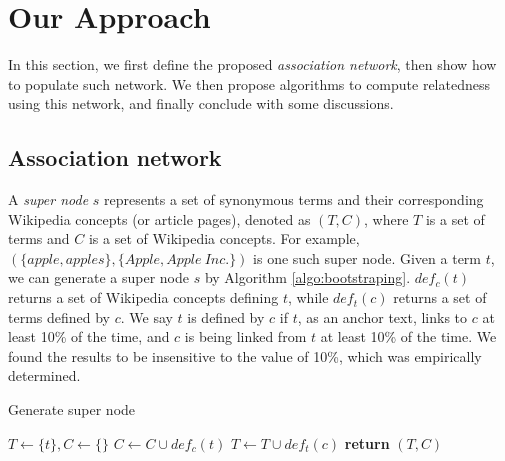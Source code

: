 \section{Our Approach}
\label{sec:approach}

In this section, we first define the proposed {\em association
network}, then show how to populate such network. We then
propose algorithms to compute relatedness using this network,
and finally conclude with some discussions. 

\subsection{Association network}
\label{sec:definition}

A {\em super node} $s$ represents a set of synonymous terms
and their corresponding Wikipedia concepts (or article pages), 
denoted as $(T, C)$, where $T$
is a set of terms and $C$ is a set of Wikipedia concepts. For
example, $(\{apple, apples\}, \{Apple, Apple\ Inc.\})$ is one such
super node. Given a term $t$, we can generate a super node $s$ by
Algorithm \ref{algo:bootstraping}.
$def_c(t)$ returns a set of Wikipedia concepts defining $t$, 
while $def_t(c)$ returns a set of terms defined by $c$. 
We say $t$ is defined by $c$ if
$t$, as an anchor text, links to $c$ at least 10\% of the time, and
$c$ is being linked from $t$ at least 10\% of the time. 
We found the results to be insensitive to the value of 10\%, 
which was empirically determined.

\begin{algorithm}[th]
\caption{Generate super node}
\label{algo:bootstraping}
\begin{algorithmic}[1]

\State $T \leftarrow \{t\}, C \leftarrow \{\}$
\State $C \leftarrow C \cup def_c(t)$
\EndFor
{}
\State $T \leftarrow T \cup def_t(c)$
\EndFor
\EndWhile
\State \textbf{return} $(T, C)$

\EndFunction
\end{algorithmic}
\end{algorithm}

